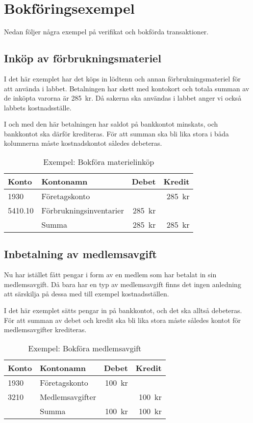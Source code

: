 \section{Bokföringsexempel}
Nedan följer några exempel på verifikat och bokförda transaktioner.

\subsection{Inköp av förbrukningsmateriel}
I det här exemplet har det köps in lödtenn och annan förbrukningsmateriel för att använda i labbet.
Betalningen har skett med kontokort och totala summan av de inköpta varorna är 285~kr. Då sakerna ska användas i labbet anger vi också labbets kostnadsställe.

I och med den här betalningen har saldot på bankkontot minskats, och bankkontot ska därför krediteras. För att summan ska bli lika stora i båda kolumnerna måste kostnadskontot således debeteras.

\begin{longtable}{llrr}
	\caption{Exempel: Bokföra materielinköp}\\
	Konto	& Kontonamn					& Debet		& Kredit\\ \toprule
	1930	& Företagskonto				& 			& 285~kr\\
	5410.10	& Förbrukningsinventarier	& 285~kr	& \\ \bottomrule
			& Summa						& 285~kr	& 285~kr
\end{longtable}

\subsection{Inbetalning av medlemsavgift}
Nu har  istället fått pengar i form av en medlem som har betalat in sin medlemsavgift. Då  bara har en typ av medlemsavgift finns det ingen anledning att särskilja på dessa med till exempel kostnadsställen.

I det här exemplet sätts pengar in på bankkontot, och det ska alltså debeteras. För att summan av debet och kredit ska bli lika stora måste således kontot för medlemsavgifter krediteras.

\begin{longtable}{llrr}
	\caption{Exempel: Bokföra medlemsavgift}\\
	Konto	& Kontonamn					& Debet		& Kredit\\ \toprule
	1930	& Företagskonto				& 100~kr	& \\
	3210	& Medlemsavgifter			& 			& 100~kr\\ \bottomrule
			& Summa						& 100~kr	& 100~kr
\end{longtable}

